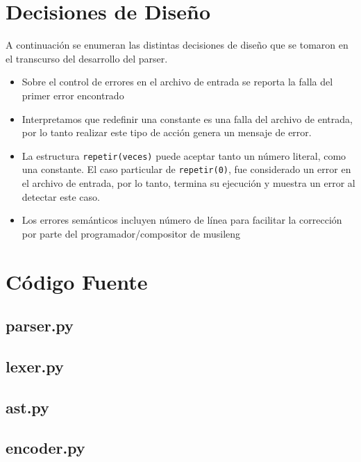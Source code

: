\documentclass[a4paper,8pt]{article}
\begin{document}
\section{Decisiones de Diseño}
A continuación se enumeran las distintas decisiones de diseño que se tomaron en el transcurso del desarrollo del parser.
\begin{itemize}
\item Sobre el control de errores en el archivo de entrada se reporta la falla del primer error encontrado
\item Interpretamos que redefinir una constante es una falla del archivo de entrada, por lo tanto realizar este tipo de acción genera un mensaje de error.
\item La estructura \texttt{repetir(veces){}} puede aceptar tanto un número literal, como una constante. El caso particular de \texttt{repetir(0)}, fue considerado un error en el archivo de entrada, por lo tanto, termina su ejecución y muestra un error al detectar este caso.
\item Los errores semánticos incluyen número de línea para facilitar la corrección por parte del programador/compositor de musileng
\end{itemize}

\newpage
\section{Código Fuente}

\subsection{parser.py}
\begin{small}
  
\end{small}
\newpage
\subsection{lexer.py}
\begin{small}
  
\end{small}
\newpage
\subsection{ast.py}
\begin{small}
  
\end{small}
\newpage
\subsection{encoder.py}
\begin{small}
  
\end{small}
\newpage
\end{document}

